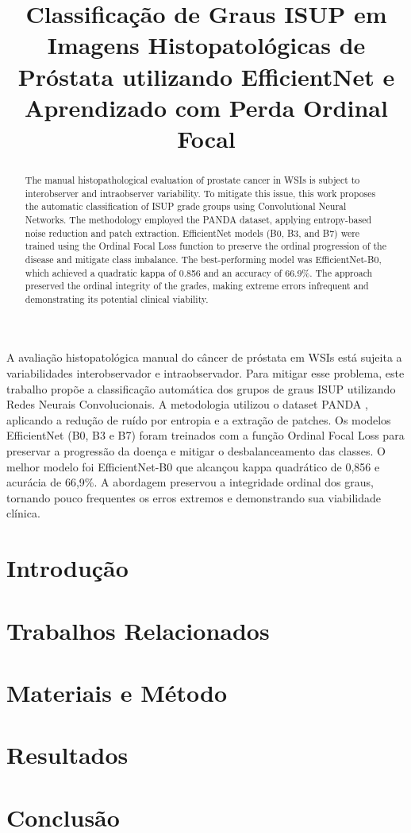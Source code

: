 \documentclass[12pt]{article}
\title{Classificação de Graus ISUP em Imagens Histopatológicas de Próstata utilizando EfficientNet e Aprendizado com Perda Ordinal Focal}
\author{}
\begin{document}
 

\maketitle

\begin{abstract}
The manual histopathological evaluation of prostate cancer in WSIs is subject to interobserver and intraobserver variability. To mitigate this issue, this work proposes the automatic classification of ISUP grade groups using Convolutional Neural Networks. The methodology employed the PANDA dataset, applying entropy-based noise reduction and patch extraction. EfficientNet models (B0, B3, and B7) were trained using the Ordinal Focal Loss function to preserve the ordinal progression of the disease and mitigate class imbalance. The best-performing model was EfficientNet-B0, which achieved a quadratic kappa of 0.856 and an accuracy of 66.9\%. The approach preserved the ordinal integrity of the grades, making extreme errors infrequent and demonstrating its potential clinical viability.
\end{abstract}
     
\begin{resumo}
A avaliação histopatológica manual do câncer de próstata em WSIs está sujeita a variabilidades interobservador e intraobservador. Para mitigar esse problema, este trabalho propõe a classificação automática dos grupos de graus ISUP utilizando Redes Neurais Convolucionais. A metodologia utilizou o dataset PANDA , aplicando a redução de ruído por entropia e a extração de patches. Os modelos EfficientNet (B0, B3 e B7) foram treinados com a função Ordinal Focal Loss para preservar a progressão da doença e mitigar o desbalanceamento das classes. O melhor modelo foi EfficientNet-B0 que alcançou kappa quadrático de 0,856 e acurácia de 66,9\%. A abordagem preservou a integridade ordinal dos graus, tornando pouco frequentes os erros extremos e demonstrando sua viabilidade clínica.
\end{resumo}


\section{Introdução}


\section{Trabalhos Relacionados} \label{sec:related-work}


\section{Materiais e Método}
\label{sec:method}


\section{Resultados}
\label{sec:results}


\section{Conclusão}




\end{document}
